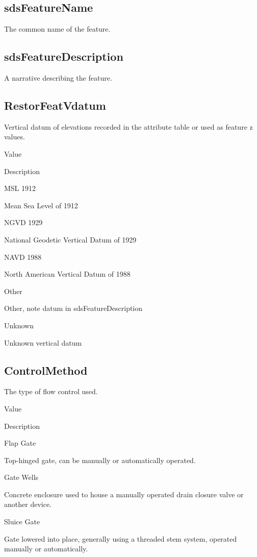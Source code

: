 \documentclass[
  letterpaper,
  DIV=11,
  numbers=noendperiod]{scrreprt}
\begin{document}
\subsection{sdsFeatureName}\label{sdsfeaturename-14}

The common name of the feature.

\subsection{sdsFeatureDescription}\label{sdsfeaturedescription-14}

A narrative describing the feature.

\subsection{RestorFeatVdatum}\label{restorfeatvdatum-14}

Vertical datum of elevations recorded in the attribute table or used as
feature z values.

Value

Description

MSL 1912

Mean Sea Level of 1912

NGVD 1929

National Geodetic Vertical Datum of 1929

NAVD 1988

North American Vertical Datum of 1988

Other

Other, note datum in sdsFeatureDescription

Unknown

Unknown vertical datum

\subsection{ControlMethod}\label{controlmethod}

The type of flow control used.

Value

Description

Flap Gate

Top-hinged gate, can be manually or automatically operated.

Gate Wells

Concrete enclosure used to house a manually operated drain closure valve
or another device.

Sluice Gate

Gate lowered into place, generally using a threaded stem system,
operated manually or automatically.
\end{document}
